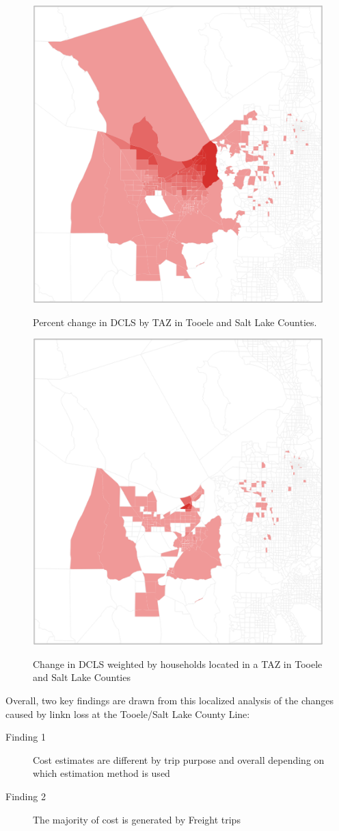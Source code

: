 \begin{figure}[H]
\begin{center}
{\centering \includegraphics[width=0.50\linewidth]{figures/chapter4/percentchangechoropleth.png}}

\caption{Percent change in DCLS by TAZ in Tooele and Salt Lake Counties.}
\label{fig:percentchangemap}
\end{center}
\end{figure}

\begin{figure}[H]
  \squeezeup
\begin{center}
{\centering \includegraphics[width=0.50\linewidth]{figures/chapter4/populationweightedchangechoropleth.png}}

\caption{Change in DCLS weighted by households located in a TAZ in Tooele and Salt Lake Counties}
\label{fig:hhmap}
\end{center}
\end{figure}

\squeezeup
\squeezeup
\squeezeup
\squeezeup
\squeezeup
\pagebreak
Overall, two key findings are drawn from this localized analysis of the changes caused by linkn loss at the Tooele/Salt Lake County Line:
\begin{description}
  \item [Finding 1]{Cost estimates are different by trip purpose and overall depending on
  which estimation method is used}
  \item [Finding 2]{The majority of cost is generated by Freight trips}
\end{description}


